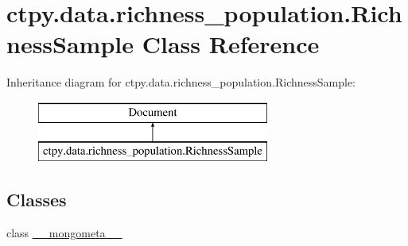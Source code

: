 \hypertarget{classctpy_1_1data_1_1richness__population_1_1_richness_sample}{\section{ctpy.\-data.\-richness\-\_\-population.\-Richness\-Sample Class Reference}
\label{classctpy_1_1data_1_1richness__population_1_1_richness_sample}
}
Inheritance diagram for ctpy.\-data.\-richness\-\_\-population.\-Richness\-Sample\-:\begin{figure}[H]
\begin{center}
\leavevmode
\includegraphics[height=2.000000cm]{classctpy_1_1data_1_1richness__population_1_1_richness_sample}
\end{center}
\end{figure}
\subsection*{Classes}
\begin{DoxyCompactItemize}
\item 
class \hyperlink{classctpy_1_1data_1_1richness__population_1_1_richness_sample_1_1____mongometa____}{\-\_\-\-\_\-mongometa\-\_\-\-\_\-}
\end{DoxyCompactItemize}
